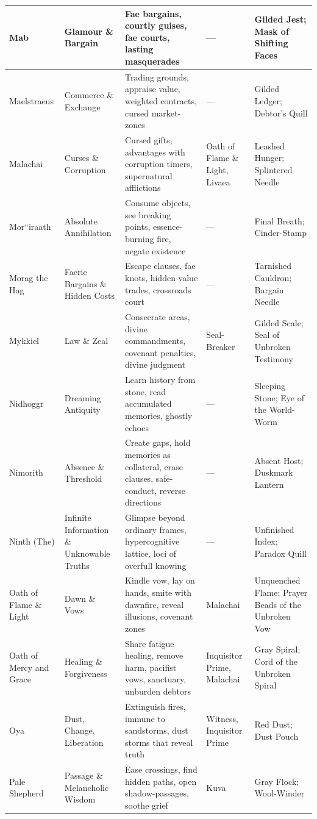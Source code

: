 \begin{center}
\begin{longtable}{p{2.2cm}p{2.5cm}p{3.5cm}p{1.6cm}p{3.2cm}}
\hline
Mab & Glamour \& Bargain & Fae bargains, courtly guises, fae courts, lasting masquerades & --- & Gilded Jest; Mask of Shifting Faces \\
\hline
Maelstraeus & Commerce \& Exchange & Trading grounds, appraise value, weighted contracts, cursed market-zones & --- & Gilded Ledger; Debtor's Quill \\
\hline
Malachai & Curses \& Corruption & Cursed gifts, advantages with corruption timers, supernatural afflictions & Oath of Flame \& Light, Livaea & Leashed Hunger; Splintered Needle \\
\hline
Mor``iraath & Absolute Annihilation & Consume objects, see breaking points, essence-burning fire, negate existence & --- & Final Breath; Cinder-Stamp \\
\hline
Morag the Hag & Faerie Bargains \& Hidden Costs & Escape clauses, fae knots, hidden-value trades, crossroads court & --- & Tarnished Cauldron; Bargain Needle \\
\hline
Mykkiel & Law \& Zeal & Consecrate areas, divine commandments, covenant penalties, divine judgment & Seal-Breaker & Gilded Scale; Seal of Unbroken Testimony \\
\hline
Nidhoggr & Dreaming Antiquity & Learn history from stone, read accumulated memories, ghostly echoes & --- & Sleeping Stone; Eye of the World-Worm \\
\hline
Nimorith & Absence \& Threshold & Create gaps, hold memories as collateral, erase clauses, safe-conduct, reverse directions & --- & Absent Host; Duskmark Lantern \\
\hline
Ninth (The) & Infinite Information \& Unknowable Truths & Glimpse beyond ordinary frames, hypercognitive lattice, loci of overfull knowing & --- & Unfinished Index; Paradox Quill \\
\hline
Oath of Flame \& Light & Dawn \& Vows & Kindle vow, lay on hands, smite with dawnfire, reveal illusions, covenant zones & Malachai & Unquenched Flame; Prayer Beads of the Unbroken Vow \\
\hline
Oath of Mercy and Grace & Healing \& Forgiveness & Share fatigue healing, remove harm, pacifist vows, sanctuary, unburden debtors & Inquisitor Prime, Malachai & Gray Spiral; Cord of the Unbroken Spiral \\
\hline
Oya & Dust, Change, Liberation & Extinguish fires, immune to sandstorms, dust storms that reveal truth & Witness, Inquisitor Prime & Red Dust; Dust Pouch \\
\hline
Pale Shepherd & Passage \& Melancholic Wisdom & Ease crossings, find hidden paths, open shadow-passages, soothe grief & Kuva & Gray Flock; Wool-Winder \\

\end{longtable}
\end{center}
